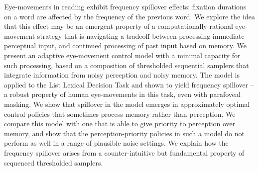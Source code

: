 Eye-movements in reading exhibit frequency spillover effects: fixation durations on a word are affected by the frequency of the previous word. We explore the idea that this effect may be an emergent property of a computationally rational eye-movement strategy that is navigating a tradeoff between processing immediate perceptual input, and continued processing of past input based on memory. We present an adaptive eye-movement control model with a minimal capacity for such processing, based on a composition of thresholded sequential samplers that integrate information from noisy perception and noisy memory.  The model is applied to the List Lexical Decision Task and shown to yield frequency spillover -- a robust property of human eye-movements in this task, even with parafoveal masking.  We show that spillover in the model emerges in approximately optimal control policies that sometimes process memory rather than perception. We compare this model with one that is able to give priority to perception over memory, and show that the perception-priority policies in such a model do not perform as well in a range of plausible noise settings.  We explain how the frequency spillover arises from a counter-intuitive but fundamental property of sequenced thresholded samplers.
